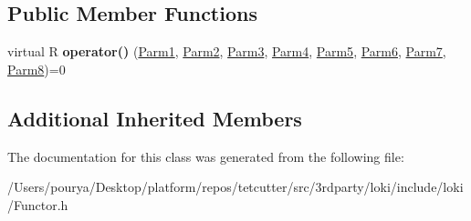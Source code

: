 \subsection*{Public Member Functions}
\begin{DoxyCompactItemize}
\item 
\hypertarget{classLoki_1_1FunctorImpl_3_01R_00_01LOKI__TYPELIST__8_07P1_00_01P2_00_01P3_00_01P4_00_01P5_00_0107a4feb1ead61f16d15a34e72c5289f3_a248899198ae4511f6a1b0b407570e3a9}{}virtual R {\bfseries operator()} (\hyperlink{classLoki_1_1EmptyType}{Parm1}, \hyperlink{classLoki_1_1EmptyType}{Parm2}, \hyperlink{classLoki_1_1EmptyType}{Parm3}, \hyperlink{classLoki_1_1EmptyType}{Parm4}, \hyperlink{classLoki_1_1EmptyType}{Parm5}, \hyperlink{classLoki_1_1EmptyType}{Parm6}, \hyperlink{classLoki_1_1EmptyType}{Parm7}, \hyperlink{classLoki_1_1EmptyType}{Parm8})=0\label{classLoki_1_1FunctorImpl_3_01R_00_01LOKI__TYPELIST__8_07P1_00_01P2_00_01P3_00_01P4_00_01P5_00_0107a4feb1ead61f16d15a34e72c5289f3_a248899198ae4511f6a1b0b407570e3a9}

\end{DoxyCompactItemize}
\subsection*{Additional Inherited Members}


The documentation for this class was generated from the following file\+:\begin{DoxyCompactItemize}
\item 
/\+Users/pourya/\+Desktop/platform/repos/tetcutter/src/3rdparty/loki/include/loki/Functor.\+h\end{DoxyCompactItemize}
